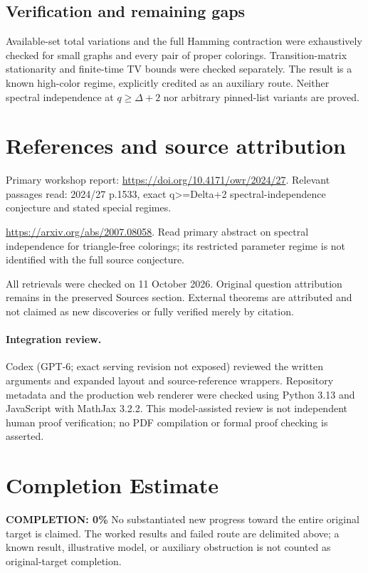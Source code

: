 \documentclass[11pt]{article}
\begin{document}
\subsection{Verification and remaining gaps}
Available-set total variations and the full Hamming contraction were exhaustively checked for small graphs and every pair of proper colorings. Transition-matrix stationarity and finite-time TV bounds were checked separately. The result is a known high-color regime, explicitly credited as an auxiliary route. Neither spectral independence at $q\ge\Delta+2$ nor arbitrary pinned-list variants are proved.

\section{References and source attribution}
Primary workshop report: \url{https://doi.org/10.4171/owr/2024/27}. Relevant passages read: 2024/27 p.1533, exact q>=Delta+2 spectral-independence conjecture and stated special regimes.

\url{https://arxiv.org/abs/2007.08058}. Read primary abstract on spectral independence for triangle-free colorings; its restricted parameter regime is not identified with the full source conjecture.

All retrievals were checked on 11 October 2026. Original question attribution remains in the preserved Sources section. External theorems are attributed and not claimed as new discoveries or fully verified merely by citation.


\paragraph{Integration review.} Codex (GPT-6; exact serving revision not exposed) reviewed the written arguments and expanded layout and source-reference wrappers. Repository metadata and the production web renderer were checked using Python 3.13 and JavaScript with MathJax 3.2.2. This model-assisted review is not independent human proof verification; no PDF compilation or formal proof checking is asserted.

\section{Completion Estimate}
\noindent\textbf{COMPLETION: 0\%}
No substantiated new progress toward the entire original target is claimed. The worked results and failed route are delimited above; a known result, illustrative model, or auxiliary obstruction is not counted as original-target completion.
\end{document}
